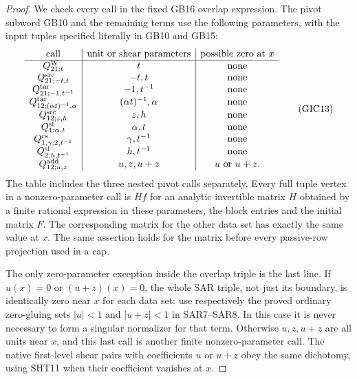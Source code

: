 \begin{proof}
We check every call in the fixed GB16 overlap expression.
The pivot subword GB10 and the remaining terms use the following
parameters, with the input tuples specified literally in GB10
and GB15:
\[
\begin{array}{c|c|c}
 \text{call}&\text{unit or shear parameters}&
             \text{possible zero at }x\\\hline
 Q^{\rm W}_{21;t}&t&\text{none}\\
 Q^{\rm src}_{21;-t,t}&-t,t&\text{none}\\
 Q^{\rm tar}_{21;-1,t^{-1}}&-1,t^{-1}&\text{none}\\
 Q^{\rm tar}_{12;(\alpha t)^{-1},\alpha}
       &(\alpha t)^{-1},\alpha&\text{none}\\
 Q^{\rm src}_{12;z,h}&z,h&\text{none}\\
 Q^{\rm sl}_{1;\alpha,t}&\alpha,t&\text{none}\\
 Q^{\rm cs}_{1,\gamma;2,t^{-1}}&\gamma,t^{-1}&\text{none}\\
 Q^{\rm sl}_{2;h,t^{-1}}&h,t^{-1}&\text{none}\\
 Q^{\rm add}_{12;u,z}&u,z,u+z&u\text{ or }u+z.
\end{array}
 \tag{GIC13}
\]
The table includes the three nested pivot calls separately.
Every full tuple vertex in a nonzero-parameter call is
$Hf$ for an analytic invertible matrix $H$ obtained by a
finite rational expression in these parameters, the block
entries and the initial matrix $F$.  The corresponding
matrix for the other data set has exactly the same value
at $x$.  The same assertion holds for the matrix before
every passive-row projection used in a cap.

The only zero-parameter exception inside the overlap triple
is the last line.  If $u(x)=0$ or $(u+z)(x)=0$, the whole
SAR triple, not just its boundary, is identically zero near
$x$ for each data set: use respectively the proved ordinary
zero-gluing sets $|u|<1$ and $|u+z|<1$ in SAR7--SAR8.
In this case it is never necessary to form a singular
normalizer for that term.  Otherwise $u,z,u+z$ are all
units near $x$, and this last call is another finite
nonzero-parameter call.  The native first-level shear pairs
with coefficients $u$ or $u+z$ obey the same dichotomy,
using SHT11 when their coefficient vanishes at $x$.


\end{proof}
